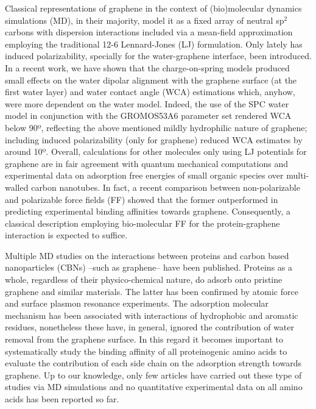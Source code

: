 \documentclass[journal=jcisd8,manuscript=article,layout=twocolumn]{achemso}
\begin{document}
Classical representations of graphene in the context of (bio)molecular dynamics simulations (MD), in their majority, model it as a fixed array of neutral sp$^2$ carbons with dispersion interactions included via a mean-field approximation employing the traditional 12-6 Lennard-Jones (LJ) formulation. \cite{Zuo_2012,Ho2014,Jimenez2014,Striolo2016,Wloch2017}
Only lately has induced polarizability, specially for the water-graphene interface, been introduced. \cite{Ho2013,Misra2017}
In a recent work, \cite{Escalona_2022} we have shown that the charge-on-spring models\cite{Yu2003} produced small effects on the water dipolar alignment with the graphene surface (at the first water layer) and water contact angle (WCA) estimations which, anyhow, were more dependent on the water model.
Indeed, the use of the SPC water model in conjunction with the GROMOS53A6 parameter set \cite{Oostenbrink_2005} rendered WCA below 90º, reflecting the above mentioned mildly hydrophilic nature of graphene; including induced polarizability (only for graphene) reduced WCA estimates by around 10º.
Overall, calculations for other molecules only using LJ potentials for graphene are in fair agreement with quantum mechanical computations \cite{Yang2012,Kamel2020} and experimental data on adsorption free energies of small organic species over multi-walled carbon nanotubes. \citep{Comer2015}
In fact, a recent comparison between non-polarizable and polarizable force fields (FF) showed that the former outperformed in predicting experimental binding affinities towards graphene. \cite{Poblete2017}
Consequently, a classical description employing bio-molecular FF for the protein-graphene interaction is expected to suffice.

Multiple MD studies on the interactions between proteins and carbon based nanoparticles (CBNs) --such as graphene-- have been published. \cite{Zheng_2003, Ge_2011, Zuo_2012, Chong_2015,Duan_2015, Shityakov_2015, Mucksch2015, Al_Qattan_2018,Puigpelat_2019,Gonz_lez_Durruthy_2020, Li_2020}
Proteins as a whole, regardless of their physico-chemical nature, do adsorb onto pristine graphene and similar materials.
The latter has been confirmed by atomic force and surface plasmon resonance experiments. \cite{Duan_2015,Chong2015}
The adsorption molecular mechanism has been associated with interactions of hydrophobic and aromatic residues, nonetheless these have, in general, ignored the contribution of water removal from the graphene surface. \cite{Liu2015}
In this regard it becomes important to systematically study the binding affinity of all proteinogenic amino acids to evaluate the contribution of each side chain on the adsorption strength towards graphene.
Up to our knowledge, only few articles have carried out these type of studies via MD simulations \cite{Hughes2015,Welch2015,Dasetty2019} and no quantitative experimental data on all amino acids has been reported so far.
\end{document}
